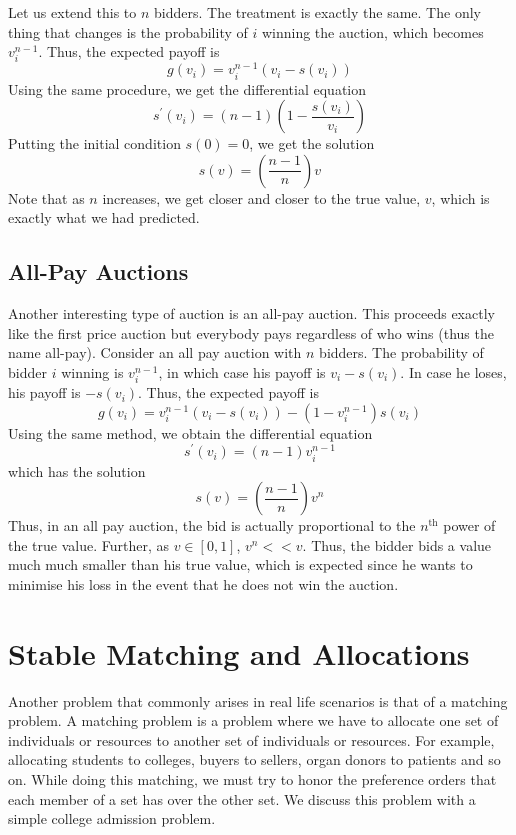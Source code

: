 \documentclass{article}
\theoremstyle{definition}
\begin{document}
Let us extend this to $n$ bidders. The treatment is exactly the same. The only thing that changes is the probability of $i$ winning the auction, which becomes $v_i^{n-1}$. Thus, the expected payoff is
\[
    g(v_i) = v_i^{n-1} \left( v_i - s(v_i) \right)
\]
Using the same procedure, we get the differential equation
\[
    s^{\prime}(v_i) = \left( n-1 \right) \left( 1 - \frac{s(v_i)}{v_i} \right)
\]
Putting the initial condition $s(0) = 0$, we get the solution
\[
    s(v) = \left( \frac{n-1}{n} \right) v
\]
Note that as $n$ increases, we get closer and closer to the true value, $v$, which is exactly what we had predicted.

\subsection{All-Pay Auctions}

Another interesting type of auction is an all-pay auction. This proceeds exactly like the first price auction but everybody pays regardless of who wins (thus the name all-pay). Consider an all pay auction with $n$ bidders. The probability of bidder $i$ winning is $v_i^{n-1}$, in which case his payoff is $v_i - s(v_i)$. In case he loses, his payoff is $-s(v_i)$. Thus, the expected payoff is
\[
    g(v_i) = v_i^{n-1} \left( v_i - s(v_i) \right) - \left( 1 - v_i^{n-1} \right) s(v_i)
\]
Using the same method, we obtain the differential equation
\[
    s^{\prime}(v_i) = \left( n-1 \right) v_i^{n-1}
\]
which has the solution
\[
    s(v) = \left( \frac{n-1}{n} \right) v^n
\]
Thus, in an all pay auction, the bid is actually proportional to the $n^{\text{th}}$ power of the true value. Further, as $v \in [0,1]$, $v^n << v$. Thus, the bidder bids a value much much smaller than his true value, which is expected since he wants to minimise his loss in the event that he does not win the auction.

\section{Stable Matching and Allocations}

Another problem that commonly arises in real life scenarios is that of a matching problem. A matching problem is a problem where we have to allocate one set of individuals or resources to another set of individuals or resources. For example, allocating students to colleges, buyers to sellers, organ donors to patients and so on. While doing this matching, we must try to honor the preference orders that each member of a set has over the other set. We discuss this problem with a simple college admission problem. 
\end{document}
